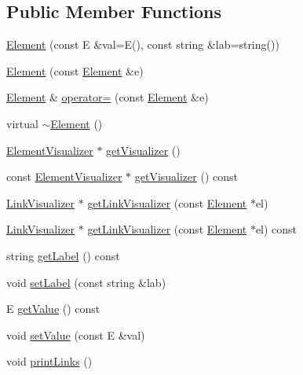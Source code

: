 \subsection*{Public Member Functions}
\begin{DoxyCompactItemize}
\item 
\mbox{\hyperlink{classbridges_1_1_element_abc7131584142ea48faf3b7a8033d1fef}{Element}} (const E \&val=E(), const string \&lab=string())
\item 
\mbox{\hyperlink{classbridges_1_1_element_a6dc69b51f85f4e9914434b8c79126057}{Element}} (const \mbox{\hyperlink{classbridges_1_1_element}{Element}} \&e)
\item 
\mbox{\hyperlink{classbridges_1_1_element}{Element}} \& \mbox{\hyperlink{classbridges_1_1_element_a0f1b5a5688fe4db68f84969e93cea245}{operator=}} (const \mbox{\hyperlink{classbridges_1_1_element}{Element}} \&e)
\item 
virtual \mbox{\hyperlink{classbridges_1_1_element_a1dcdcd8948db683fc109687fe5d9c8e1}{$\sim$\+Element}} ()
\item 
\mbox{\hyperlink{classbridges_1_1_element_visualizer}{Element\+Visualizer}} $\ast$ \mbox{\hyperlink{classbridges_1_1_element_a358f350ae6e33d55c4ac9f9213d0c5bc}{get\+Visualizer}} ()
\item 
const \mbox{\hyperlink{classbridges_1_1_element_visualizer}{Element\+Visualizer}} $\ast$ \mbox{\hyperlink{classbridges_1_1_element_a27d023054130e17234ace34ba35e766e}{get\+Visualizer}} () const
\item 
\mbox{\hyperlink{classbridges_1_1_link_visualizer}{Link\+Visualizer}} $\ast$ \mbox{\hyperlink{classbridges_1_1_element_aa8dd91d04c22c697f7c500a18642282f}{get\+Link\+Visualizer}} (const \mbox{\hyperlink{classbridges_1_1_element}{Element}} $\ast$el)
\item 
\mbox{\hyperlink{classbridges_1_1_link_visualizer}{Link\+Visualizer}} $\ast$ \mbox{\hyperlink{classbridges_1_1_element_a202553f482b9a49057c8c87a368cc93a}{get\+Link\+Visualizer}} (const \mbox{\hyperlink{classbridges_1_1_element}{Element}} $\ast$el) const
\item 
string \mbox{\hyperlink{classbridges_1_1_element_a38df6d5f1e0203dfa85b073b6756194e}{get\+Label}} () const
\item 
void \mbox{\hyperlink{classbridges_1_1_element_a22313b74452175d07650168a701daa99}{set\+Label}} (const string \&lab)
\item 
E \mbox{\hyperlink{classbridges_1_1_element_a7df53b8b248020e9536bb951c725c7ba}{get\+Value}} () const
\item 
void \mbox{\hyperlink{classbridges_1_1_element_a737cb19281b6aa45a5a1dc9d592dad93}{set\+Value}} (const E \&val)
\item 
void \mbox{\hyperlink{classbridges_1_1_element_ae6f773c7222ff3a37c402e5e1f413c66}{print\+Links}} ()
\end{DoxyCompactItemize}
